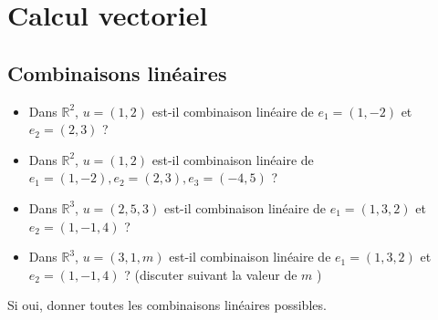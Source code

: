 \vspace{1em}
\section*{Calcul vectoriel}
\vspace{1em}

\subsection{Combinaisons linéaires}

\begin{itemize}
    \item Dans $\mathbb{R}^2$, $u=(1,2)$ est-il combinaison linéaire de $e_1=(1,-2)$ et $e_2=(2,3)$ ?
    \item Dans $\mathbb{R}^2$, $u=(1,2)$ est-il combinaison linéaire de $e_1=(1,-2), e_2=(2,3), e_3=(-4,5)$ ?
    \item Dans $\mathbb{R}^3$, $u=(2,5,3)$ est-il combinaison linéaire de $e_1=(1,3,2)$ et $e_2=(1,-1,4)$ ?
    \item Dans $\mathbb{R}^3$, $u=(3,1, m)$ est-il combinaison linéaire de $e_1=(1,3,2)$ et $e_2=(1,-1,4)$ ? \newline 
    (discuter suivant la valeur de $m$ ) 
\end{itemize}
Si oui, donner toutes les combinaisons linéaires possibles.

